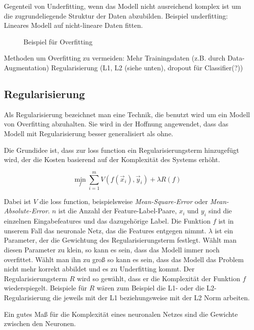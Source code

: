 Gegenteil von Underfitting, wenn das Modell nicht ausreichend komplex ist um die zugrundeliegende Struktur der Daten abzubilden. 
Beispiel underfitting: Lineares Modell auf nicht-lineare Daten fitten.

\begin{figure}
	\caption{Beispiel für Overfitting}
	\label{fig:overfitting}
\end{figure}

Methoden um Overfitting zu vermeiden:
Mehr Trainingsdaten (z.B. durch Data-Augmentation)
Regularisierung (L1, L2 (siehe unten), dropout für Classifier(?))


\subsection{Regularisierung}

Als Regularisierung bezeichnet man eine Technik, die benutzt wird um ein Modell von Overfitting abzuhalten.
Sie wird in der Hoffnung angewendet, dass das Modell mit Regularisierung besser generalisiert als ohne.

Die Grundidee ist, dass zur loss function ein Regularisierungsterm hinzugefügt wird, 
der die Kosten basierend auf der Komplexität des Systems erhöht.

\begin{equation}
	\min_f \sum\limits_{i=1}^{m} V(f(\vec{x}_i), \vec{y}_i) + \lambda R(f)
\end{equation} 

Dabei ist $V$ die loss function, beispielsweise \textit{Mean-Square-Error} oder \textit{Mean-Absolute-Error}.
$n$ ist die Anzahl der Feature-Label-Paare,
$x_i$ und $y_i$ sind die einzelnen Eingabefeatures und das dazugehörige Label.
Die Funktion $f$ ist in unserem Fall das neuronale Netz, das die Features entgegen nimmt.
$\lambda$ ist ein Parameter, der die Gewichtung des Regularisierungsterm festlegt.
Wählt man diesen Parameter zu klein, so kann es sein, dass das Modell immer noch overfittet.
Wählt man ihn zu groß so kann es sein, dass das Modell das Problem nicht mehr korrekt abbildet und es zu Underfitting kommt.
Der Regularisierungsterm $R$ wird so gewählt, dass er die Komplexität der Funktion $f$ wiederspiegelt.
Beispiele für $R$ wären zum Beispiel die L1- oder die L2-Regularisierung die jeweils mit der L1 beziehungsweise mit der L2 Norm arbeiten.

Ein gutes Maß für die Komplexität eines neuronalen Netzes sind die Gewichte zwischen den Neuronen.

